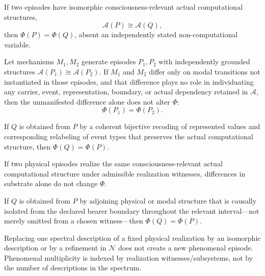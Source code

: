 \documentclass[11pt,a4paper]{article}
\theoremstyle{clean}
\theoremstyle{definition}
\begin{document}
\begin{axiombox}[title={F1. Phenomenal Actuality}]
If two episodes have isomorphic consciousness-relevant actual computational structures,
\[
\mathcal A(P)\cong\mathcal A(Q),
\]
then $\Phi(P)=\Phi(Q)$, absent an independently stated non-computational variable.
\end{axiombox}

\begin{axiombox}[title={F2. Counterfactual Irrelevance}]
Let mechanisms $M_1,M_2$ generate episodes $P_1,P_2$ with independently grounded structures $\mathcal A(P_1)\cong\mathcal A(P_2)$. If $M_1$ and $M_2$ differ only on modal transitions not instantiated in those episodes, and that difference plays no role in individuating any carrier, event, representation, boundary, or actual dependency retained in $\mathcal A$, then the unmanifested difference alone does not alter $\Phi$:
\[
\Phi(P_1)=\Phi(P_2).
\]
\end{axiombox}

\begin{axiombox}[title={F3. Representation Invariance}]
If $Q$ is obtained from $P$ by a coherent bijective recoding of represented values and corresponding relabeling of event types that preserves the actual computational structure, then $\Phi(Q)=\Phi(P)$.
\end{axiombox}

\begin{axiombox}[title={F4. Substrate Invariance}]
If two physical episodes realize the same consciousness-relevant actual computational structure under admissible realization witnesses, differences in substrate alone do not change $\Phi$.
\end{axiombox}

\begin{axiombox}[title={F5. Inert-extension Invariance}]
If $Q$ is obtained from $P$ by adjoining physical or modal structure that is causally isolated from the declared bearer boundary throughout the relevant interval---not merely omitted from a chosen witness---then $\Phi(Q)=\Phi(P)$.
\end{axiombox}

\begin{axiombox}[title={F6. Abstraction Consistency}]
Replacing one spectral description of a fixed physical realization by an isomorphic description or by a refinement in $\mathcal N$ does not create a new phenomenal episode. Phenomenal multiplicity is indexed by realization witnesses/subsystems, not by the number of descriptions in the spectrum.
\end{axiombox}
\end{document}
